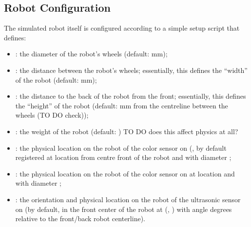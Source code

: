 \documentclass[letterpaper,10pt,english]{sphinxmanual}
\begin{document}
\subsection{Robot Configuration}
\label{\detokenize{content/00_SOFTWARE_GUIDE/Section_00_02_ev3devsim_simulator_overview:Robot-Configuration}}
The simulated robot itself is configured according to a simple set\sphinxhyphen{}up script that defines:
\begin{itemize}
\item {} 
: the diameter of the robot’s wheels (default:  mm);

\item {} 
: the distance between the robot’s wheels; essentially, this defines the “width” of the robot (default:  mm);

\item {} 
: the distance to the back of the robot from the front; essentially, this defines the “height” of the robot (default:  mm from the centreline between the wheels (TO DO \sphinxhyphen{} check));

\item {} 
: the weight of the robot (default: ) TO DO \sphinxhyphen{} does this affect physics at all?

\item {} 
: the physical location on the robot of the color sensor on  (, by default registered at location  from centre front of the robot and with diameter ;

\item {} 
: the physical location on the robot of the color sensor on  at location  and with diameter ;

\item {} 
: the orientation and physical location on the robot of the ultrasonic sensor on  (by default, in the front center of the robot at (, ) with angle  degrees relative to the front/back robot center\sphinxhyphen{}line).

\end{itemize}
\end{document}
